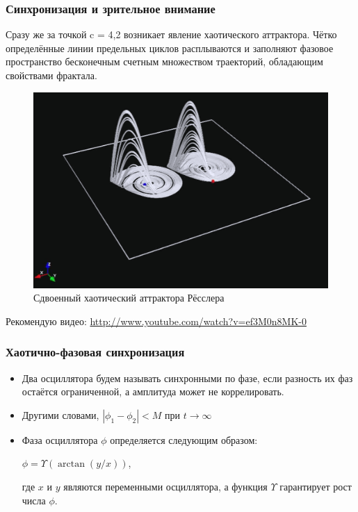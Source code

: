 \documentclass{beamer}
\begin{document}
\begin{frame}
\frametitle{Синхронизация и зрительное внимание}


Сразу же за точкой c = 4,2 возникает явление хаотического аттрактора. Чётко определённые линии предельных циклов расплываются и заполняют фазовое пространство бесконечным счетным множеством траекторий, обладающим свойствами фрактала.

\begin{figure}
\includegraphics[scale=0.10]{img/rossler}
\caption{Сдвоенный хаотический аттрактора Рёсслера}
\end{figure}

Рекомендую видео: \url{http://www.youtube.com/watch?v=ef3M0n8MK-0}

\end{frame}

\begin{frame}
\frametitle{Хаотично-фазовая синхронизация}

\begin{itemize}
\item[]Два осциллятора будем называть синхронными по фазе, если разность их фаз остаётся ограниченной, а амплитуда может не коррелировать.
\bigskip
\item[] Другими словами, $|\phi_1 - \phi_2| < M$ при $t \to \infty$
\item[] Фаза осциллятора $\phi$ определяется следующим образом:
\begin{center}
$\phi = \Upsilon (\arctan (y/x))$,
\end{center}
где $x$ и $y$ являются переменными осциллятора, а функция $\Upsilon$ гарантирует рост числа $\phi$.
\end{itemize}

\end{frame}
\end{document}
